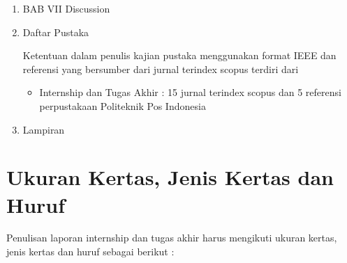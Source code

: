 \begin{enumerate}
\begin{enumerate}
\item BAB VII Discussion

\item Daftar Pustaka

Ketentuan dalam penulis kajian pustaka menggunakan format IEEE dan referensi yang bersumber dari jurnal terindex scopus terdiri dari
\begin{itemize}
\item
Internship dan Tugas Akhir : 15 jurnal terindex scopus dan 5 referensi perpustakaan Politeknik Pos Indonesia
\end{itemize}
\item Lampiran
\end{enumerate}
\end{enumerate}

\section{Ukuran Kertas, Jenis Kertas dan Huruf}
Penulisan laporan internship dan tugas akhir harus mengikuti ukuran kertas, jenis kertas dan huruf sebagai berikut :
